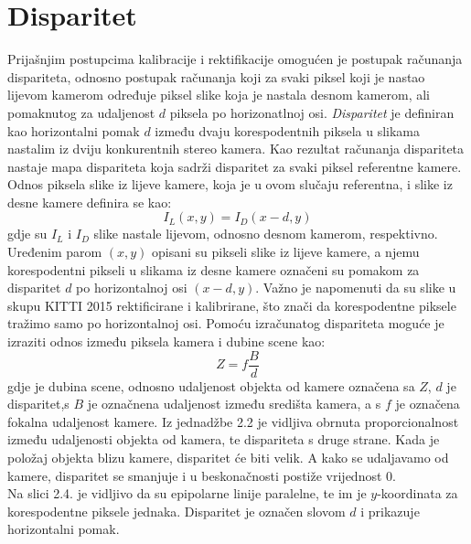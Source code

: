 \documentclass[times, utf8, zavrsni, numeric]{fer}
\begin{document}
\section{Disparitet}
Prijašnjim postupcima kalibracije i rektifikacije omogućen je postupak računanja dispariteta, odnosno postupak računanja koji za svaki piksel koji je nastao lijevom kamerom određuje piksel slike koja je nastala desnom kamerom, ali pomaknutog za udaljenost $d$ piksela po horizonatlnoj osi. \textit{Disparitet} je definiran kao horizontalni pomak $d$ između dvaju korespodentnih piksela u slikama nastalim iz dviju konkurentnih stereo kamera. Kao rezultat računanja dispariteta nastaje mapa dispariteta koja sadrži disparitet za svaki piksel referentne kamere. Odnos piksela slike iz lijeve kamere, koja je u ovom slučaju referentna, i slike iz desne kamere definira se kao: 
\begin{equation}
I_{L}(x, y) = I_{D}(x-d,y)
\label{eq:Disparitet}
\end{equation}
gdje su $I_{L}$ i $I_{D}$ slike nastale lijevom, odnosno desnom kamerom, respektivno. Uređenim parom $(x,y)$ opisani su pikseli slike iz lijeve kamere, a njemu korespodentni pikseli u slikama iz desne kamere označeni su pomakom za disparitet $d$ po horizontalnoj osi $(x-d,y)$. Važno je napomenuti da su slike u skupu KITTI 2015 rektificirane i kalibrirane, što znači da korespodentne piksele tražimo samo po horizontalnoj osi.
Pomoću izračunatog dispariteta moguće je izraziti odnos između piksela kamera i dubine scene kao:
\begin{equation}
Z=f\frac{B}{d}
\label{eq:Fokalna}
\end{equation}
gdje je dubina scene, odnosno udaljenost objekta od kamere označena sa $Z$, $d$ je disparitet,s $B$ je označnena udaljenost između središta kamera, a s $f$ je označena fokalna udaljenost kamere. Iz jednadžbe 2.2 je vidljiva obrnuta proporcionalnost između udaljenosti objekta od kamera, te dispariteta s druge strane. Kada je položaj objekta blizu kamere, disparitet će biti velik. A kako se udaljavamo od kamere, disparitet se smanjuje i u beskonačnosti postiže vrijednost 0.\\
Na slici 2.4. je vidljivo da su epipolarne linije paralelne, te im je $y$-koordinata za korespodentne piksele jednaka. Disparitet je označen slovom $d$ i prikazuje horizontalni pomak.
\end{document}
